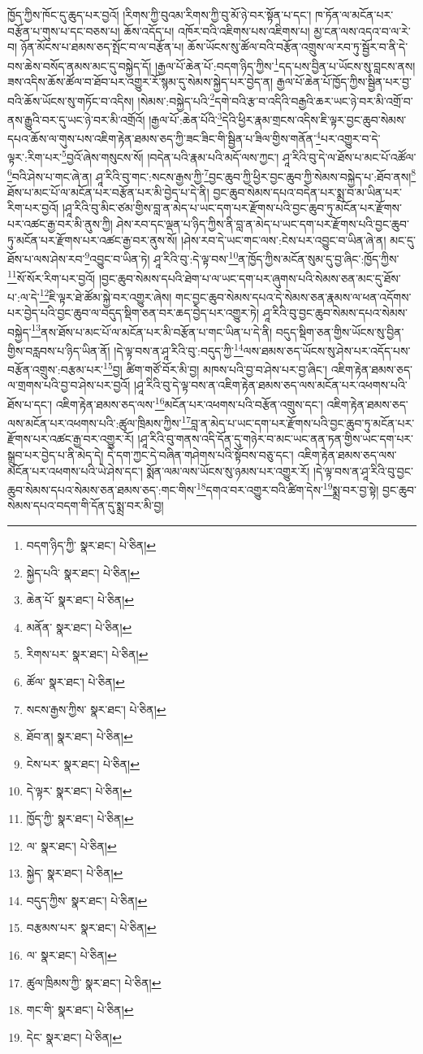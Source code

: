ཁྱོད་ཀྱིས་ཁོང་དུ་ཆུད་པར་བྱའོ། །རིགས་ཀྱི་བུའམ་རིགས་ཀྱི་བུ་མོ་ཉེ་བར་སྟོན་པ་དང་། ཁ་ཏོན་ལ་མངོན་པར་བརྩོན་པ་གུས་པ་དང་བཅས་པ། ཆོས་འདོད་པ། འཁོར་བའི་འཇིགས་པས་འཇིགས་པ། མྱ་ངན་ལས་འདའ་བ་ལ་རེ་བ། ཉོན་མོངས་པ་ཐམས་ཅད་སྤོང་བ་ལ་བརྩོན་པ། ཆོས་ཡོངས་སུ་ཚོལ་བའི་བརྩོན་འགྲུས་ལ་རབ་ཏུ་སྦྱོར་བ་ནི་དེ་བས་ཆེས་བསོད་ནམས་མང་དུ་བསྐྱེད་དོ། །རྒྱལ་པོ་ཆེན་པོ་:བདག་ཉིད་ཀྱིས་\footnote{བདག་ཉིད་ཀྱི་  སྣར་ཐང་།  པེ་ཅིན། }དད་པས་བྱིན་པ་ཡོངས་སུ་བླངས་ནས། ཟས་འདིས་ཆོས་ཚོལ་བ་ཐོབ་པར་འགྱུར་རོ་སྙམ་དུ་སེམས་སྐྱེད་པར་བྱེད་ན། རྒྱལ་པོ་ཆེན་པོ་ཁྱོད་ཀྱིས་སྦྱིན་པར་བྱ་བའི་ཆོས་ཡོངས་སུ་གཏོང་བ་འདིས། །སེམས་:བསྐྱེད་པའི་\footnote{སྐྱེད་པའི་  སྣར་ཐང་།  པེ་ཅིན། }དགེ་བའི་རྩ་བ་འདིའི་བརྒྱའི་ཆར་ཡང་ཉེ་བར་མི་འགྲོ་བ་ནས་རྒྱུའི་བར་དུ་ཡང་ཉེ་བར་མི་འགྲོའོ། །རྒྱལ་པོ་:ཆེན་པོའི་\footnote{ཆེན་པོ་  སྣར་ཐང་།  པེ་ཅིན། }དེའི་ཕྱིར་རྣམ་གྲངས་འདིས་ཇི་ལྟར་བྱང་ཆུབ་སེམས་དཔའ་ཆོས་ལ་གུས་པས་འཇིག་རྟེན་ཐམས་ཅད་ཀྱི་ཟང་ཟིང་གི་སྦྱིན་པ་ཟིལ་གྱིས་གནོན་\footnote{མནོན་  སྣར་ཐང་།  པེ་ཅིན། }པར་འགྱུར་བ་དེ་ལྟར་:རིག་པར་\footnote{རིགས་པར་  སྣར་ཐང་།  པེ་ཅིན། }བྱའོ་ཞེས་གསུངས་སོ། །བདེན་པའི་རྣམ་པའི་མདོ་ལས་ཀྱང་། ཤཱ་རིའི་བུ་དེ་ལ་ཐོས་པ་མང་པོ་འཚོལ་\footnote{ཚོལ་  སྣར་ཐང་།  པེ་ཅིན། }བའི་ཤེས་པ་གང་ཞེ་ན། ཤཱ་རིའི་བུ་གང་:སངས་རྒྱས་ཀྱི་\footnote{སངས་རྒྱས་ཀྱིས་  སྣར་ཐང་།  པེ་ཅིན། }བྱང་ཆུབ་ཀྱི་ཕྱིར་བྱང་ཆུབ་ཀྱི་སེམས་བསྐྱེད་པ་:ཐོབ་ནས།\footnote{ཐོབ་ན།  སྣར་ཐང་།  པེ་ཅིན། } ཐོས་པ་མང་པོ་ལ་མངོན་པར་བརྩོན་པར་མི་བྱེད་པ་དེ་ནི། བྱང་ཆུབ་སེམས་དཔའ་བདེན་པར་སྨྲ་བ་མ་ཡིན་པར་རིག་པར་བྱའོ། །ཤཱ་རིའི་བུ་མིང་ཙམ་གྱིས་བླ་ན་མེད་པ་ཡང་དག་པར་རྫོགས་པའི་བྱང་ཆུབ་ཏུ་མངོན་པར་རྫོགས་པར་འཚང་རྒྱ་བར་མི་ནུས་ཀྱི། ཤེས་རབ་དང་ལྡན་པ་ཉིད་ཀྱིས་ནི་བླ་ན་མེད་པ་ཡང་དག་པར་རྫོགས་པའི་བྱང་ཆུབ་ཏུ་མངོན་པར་རྫོགས་པར་འཚང་རྒྱ་བར་ནུས་སོ། །ཤེས་རབ་དེ་ཡང་གང་ལས་:ངེས་པར་འབྱུང་བ་ཡིན་ཞེ་ན། མང་དུ་ཐོས་པ་ལས་ཤེས་རབ་\footnote{ངེས་པར་  སྣར་ཐང་།  པེ་ཅིན། }འབྱུང་བ་ཡིན་ཏེ། ཤཱ་རིའི་བུ་:དེ་ལྟ་བས་\footnote{དེ་ལྟར་  སྣར་ཐང་།  པེ་ཅིན། }ན་ཁྱོད་ཀྱིས་མངོན་སུམ་དུ་བྱ་ཞིང་:ཁྱོད་ཀྱིས་\footnote{ཁྱོད་ཀྱི་  སྣར་ཐང་།  པེ་ཅིན། }སོ་སོར་རིག་པར་བྱའོ། །བྱང་ཆུབ་སེམས་དཔའི་ཐེག་པ་ལ་ཡང་དག་པར་ཞུགས་པའི་སེམས་ཅན་མང་དུ་ཐོས་པ་:ལ་དེ་\footnote{ལ་  སྣར་ཐང་།  པེ་ཅིན། }ཇི་ལྟར་ཐེ་ཚོམ་སྐྱེ་བར་འགྱུར་ཞེས། གང་བྱང་ཆུབ་སེམས་དཔའ་དེ་སེམས་ཅན་རྣམས་ལ་ཕན་འདོགས་པར་བྱེད་པའི་བྱང་ཆུབ་ལ་བདུད་སྡིག་ཅན་བར་ཆད་བྱེད་པར་འགྱུར་ཏེ། ཤཱ་རིའི་བུ་བྱང་ཆུབ་སེམས་དཔའ་སེམས་བསྐྱེད་\footnote{སྐྱེད་  སྣར་ཐང་།  པེ་ཅིན། }ནས་ཐོས་པ་མང་པོ་ལ་མངོན་པར་མི་བརྩོན་པ་གང་ཡིན་པ་དེ་ནི། བདུད་སྡིག་ཅན་གྱིས་ཡོངས་སུ་བྱིན་གྱིས་བརླབས་པ་ཉིད་ཡིན་ནོ། །དེ་ལྟ་བས་ན་ཤཱ་རིའི་བུ་:བདུད་ཀྱི་\footnote{བདུད་ཀྱིས་  སྣར་ཐང་།  པེ་ཅིན། }ལས་ཐམས་ཅད་ཡོངས་སུ་ཤེས་པར་འདོད་པས་བརྩོན་འགྲུས་:བརྩམ་པར་\footnote{བརྩམས་པར་  སྣར་ཐང་།  པེ་ཅིན། }བྱ། ཚིག་གཙོ་བོར་མི་བྱ། མཁས་པའི་བྱ་བ་ཤེས་པར་བྱ་ཞིང་། འཇིག་རྟེན་ཐམས་ཅད་ལ་གྲགས་པའི་བྱ་བ་ཤེས་པར་བྱའོ། །ཤཱ་རིའི་བུ་དེ་ལྟ་བས་ན་འཇིག་རྟེན་ཐམས་ཅད་ལས་མངོན་པར་འཕགས་པའི་ཐོས་པ་དང་། འཇིག་རྟེན་ཐམས་ཅད་ལས་\footnote{ལ་  སྣར་ཐང་།  པེ་ཅིན། }མངོན་པར་འཕགས་པའི་བརྩོན་འགྲུས་དང་། འཇིག་རྟེན་ཐམས་ཅད་ལས་མངོན་པར་འཕགས་པའི་:ཚུལ་ཁྲིམས་ཀྱིས་\footnote{ཚུལ་ཁྲིམས་ཀྱི་  སྣར་ཐང་།  པེ་ཅིན། }བླ་ན་མེད་པ་ཡང་དག་པར་རྫོགས་པའི་བྱང་ཆུབ་ཏུ་མངོན་པར་རྫོགས་པར་འཚང་རྒྱ་བར་འགྱུར་རོ། །ཤཱ་རིའི་བུ་གནས་འདི་དོན་དུ་གཉེར་བ་མང་ཡང་ནན་ཏན་གྱིས་ཡང་དག་པར་སྒྲུབ་པར་བྱེད་པ་ནི་མེད་དེ། དེ་དག་ཀྱང་དེ་བཞིན་གཤེགས་པའི་སྟོབས་བཅུ་དང་། འཇིག་རྟེན་ཐམས་ཅད་ལས་མངོན་པར་འཕགས་པའི་ཡེ་ཤེས་དང་། སྨོན་ལམ་ལས་ཡོངས་སུ་ཉམས་པར་འགྱུར་རོ། །དེ་ལྟ་བས་ན་ཤཱ་རིའི་བུ་བྱང་ཆུབ་སེམས་དཔའ་སེམས་ཅན་ཐམས་ཅད་:གང་གིས་\footnote{གང་གི་  སྣར་ཐང་།  པེ་ཅིན། }དགའ་བར་འགྱུར་བའི་ཚིག་དེས་\footnote{དེང་  སྣར་ཐང་།  པེ་ཅིན། }སྨྲ་བར་བྱ་སྟེ། བྱང་ཆུབ་སེམས་དཔའ་བདག་གི་དོན་དུ་སྨྲ་བར་མི་བྱ། 